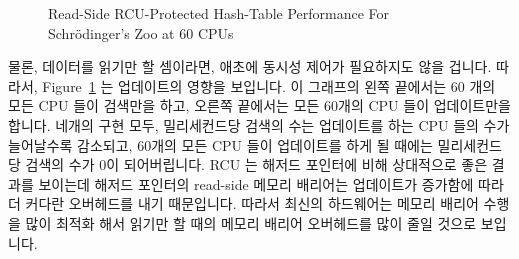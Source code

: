 \begin{figure}[tb]
\centering
{}
\caption{Read-Side RCU-Protected Hash-Table Performance For Schr\"odinger's Zoo at 60 CPUs}
\label{fig:datastruct:Read-Side RCU-Protected Hash-Table Performance For Schroedinger's Zoo at 60 CPUs}
\end{figure}

물론, 데이터를 읽기만 할 셈이라면, 애초에 동시성 제어가 필요하지도 않을 겁니다.
따라서, Figure~\ref{fig:datastruct:Read-Side RCU-Protected Hash-Table Performance For Schroedinger's Zoo at 60 CPUs}
는 업데이트의 영향을 보입니다.
이 그래프의 왼쪽 끝에서는 60 개의 모든 CPU 들이 검색만을 하고, 오른쪽 끝에서는
모든 60개의 CPU 들이 업데이트만을 합니다.
네개의 구현 모두, 밀리세컨드당 검색의 수는 업데이트를 하는 CPU 들의 수가
늘어날수록 감소되고, 60개의 모든 CPU 들이 업데이트를 하게 될 때에는
밀리세컨드당 검색의 수가 0이 되어버립니다.
RCU 는 해저드 포인터에 비해 상대적으로 좋은 결과를 보이는데 해저드 포인터의
read-side 메모리 배리어는 업데이트가 증가함에 따라 더 커다란 오버헤드를 내기
때문입니다.
따라서 최신의 하드웨어는 메모리 배리어 수행을 많이 최적화 해서 읽기만 할 때의
메모리 배리어 오버헤드를 많이 줄일 것으로 보입니다.

